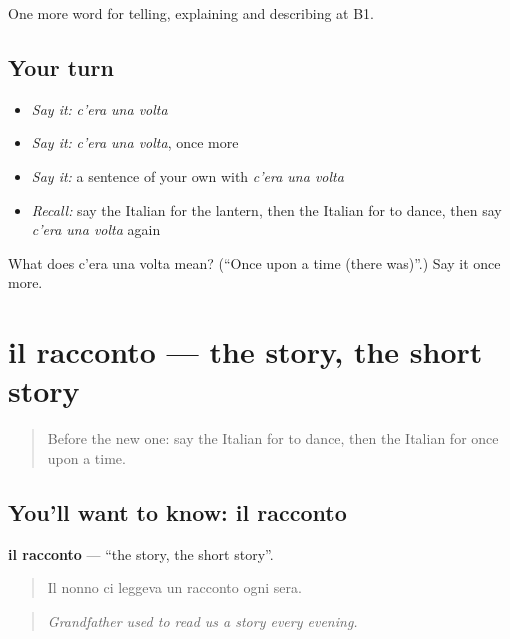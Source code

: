 \begin{grammarlens}[title={What you've built}]
One more word for telling, explaining and describing at B1.
\end{grammarlens}

\subsection*{Your turn}
\begin{itemize}
\raggedright
  \item \emph{Say it:} \emph{c'era una volta}
  \item \emph{Say it:} \emph{c'era una volta}, once more
  \item \emph{Say it:} a sentence of your own with \emph{c'era una volta}
  \item \emph{Recall:} say the Italian for the lantern, then the Italian for to dance, then say \emph{c'era una volta} again
\end{itemize}

\begin{tcolorbox}[breakable,colback=teal!4,colframe=teal!35!black,title={Before you move on}]
What does c'era una volta mean? (\textquotedblleft{}Once upon a time (there was)\textquotedblright{}.) Say it once more.
\end{tcolorbox}
\section[il racconto]{il racconto — the story, the short story}

\label{lesson:IT-C323-racconto}



\begin{quote}
Before the new one: say the Italian for to dance, then the Italian for once upon a time.
\end{quote}

\subsection*{You'll want to know: il racconto}
\textbf{il racconto} — \textquotedblleft{}the story, the short story\textquotedblright{}.

\begin{quote}
Il nonno ci leggeva un racconto ogni sera.
\end{quote}

\begin{quote}
\emph{Grandfather used to read us a story every evening.}
\end{quote}

